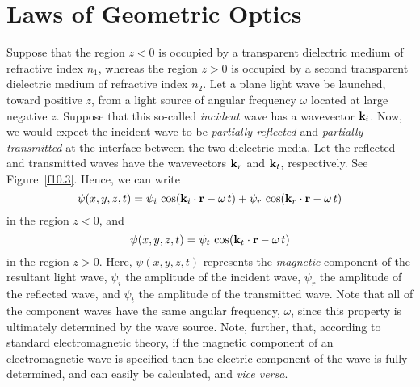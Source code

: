 \section{Laws of Geometric Optics}\label{sgeo}
Suppose that the region $z<0$ is occupied by a transparent dielectric medium of refractive index $n_1$, whereas
the region $z>0$ is occupied by a second transparent dielectric medium of refractive index $n_2$. Let a plane light wave be launched, toward positive $z$,  from a
light source of angular frequency $\omega$ located at  large negative $z$. Suppose that  this so-called {\em incident}\/ wave has a
wavevector ${\bf k}_i$. Now, we would expect the incident wave to be {\em partially reflected}\/ and {\em partially
transmitted}\/ at the interface between the two dielectric media. 
Let the reflected and transmitted waves have the wavevectors 
${\bf k}_r$ and ${\bf k}_t$, respectively. See Figure~\ref{f10.3}.  Hence, we can write
\begin{equation}
\psi(x,y,z,t)= \psi_i \,\cos({\bf k}_i\cdot{\bf r}-\omega\,t) + \psi_r\,\cos({\bf k}_r\cdot{\bf r}-\omega\,t)
\end{equation}
in the region $z<0$, and
\begin{equation}
\psi(x,y,z,t)= \psi_t\,\cos({\bf k}_t\cdot{\bf r}-\omega\,t)
\end{equation}
in the region $z>0$. Here, $\psi(x,y,z,t)$ represents the {\em magnetic}\/ component of the resultant light wave, $\psi_i$ the
amplitude of the incident wave, $\psi_r$ the amplitude of the reflected wave, and $\psi_t$ the amplitude of the
transmitted wave. Note that all of the component waves have the same angular frequency, $\omega$, since this property is
ultimately determined by the wave source. Note, further, that, according to standard electromagnetic
theory, if the magnetic component of an electromagnetic wave is specified then the electric
component of the wave is fully determined, and can easily be calculated, and {\em vice versa}. 

